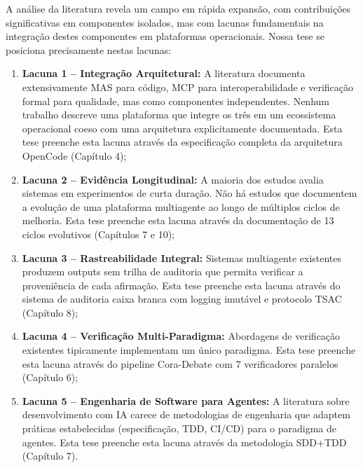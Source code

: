 \documentclass[12pt,a4paper,sumario=tradicional,openany]{abntex2}
\begin{document}
A análise da literatura revela um campo em rápida expansão, com contribuições significativas em componentes isolados, mas com lacunas fundamentais na integração destes componentes em plataformas operacionais. Nossa tese se posiciona precisamente nestas lacunas:

\begin{enumerate}[leftmargin=*]
    \item \textbf{Lacuna 1 -- Integração Arquitetural:} A literatura documenta extensivamente MAS para código, MCP para interoperabilidade e verificação formal para qualidade, mas como componentes independentes. Nenhum trabalho descreve uma plataforma que integre os três em um ecossistema operacional coeso com uma arquitetura explicitamente documentada. Esta tese preenche esta lacuna através da especificação completa da arquitetura OpenCode (Capítulo 4);
    
    \item \textbf{Lacuna 2 -- Evidência Longitudinal:} A maioria dos estudos avalia sistemas em experimentos de curta duração. Não há estudos que documentem a evolução de uma plataforma multiagente ao longo de múltiplos ciclos de melhoria. Esta tese preenche esta lacuna através da documentação de 13 ciclos evolutivos (Capítulos 7 e 10);
    
    \item \textbf{Lacuna 3 -- Rastreabilidade Integral:} Sistemas multiagente existentes produzem outputs sem trilha de auditoria que permita verificar a proveniência de cada afirmação. Esta tese preenche esta lacuna através do sistema de auditoria caixa branca com logging imutável e protocolo TSAC (Capítulo 8);
    
    \item \textbf{Lacuna 4 -- Verificação Multi-Paradigma:} Abordagens de verificação existentes tipicamente implementam um único paradigma. Esta tese preenche esta lacuna através do pipeline Cora-Debate com 7 verificadores paralelos (Capítulo 6);
    
    \item \textbf{Lacuna 5 -- Engenharia de Software para Agentes:} A literatura sobre desenvolvimento com IA carece de metodologias de engenharia que adaptem práticas estabelecidas (especificação, TDD, CI/CD) para o paradigma de agentes. Esta tese preenche esta lacuna através da metodologia SDD+TDD (Capítulo 7).
\end{enumerate}

\end{document}
